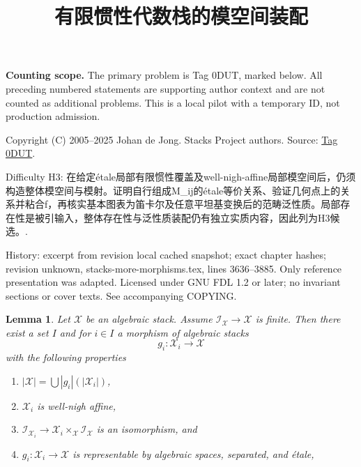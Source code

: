 \documentclass{amsart}
\theoremstyle{plain}
\newtheorem{lemma}[subsection]{Lemma}
\theoremstyle{definition}
\theoremstyle{remark}
\numberwithin{equation}{subsection}
\begin{document}
\title[Stacks Project, Tag 0DUT]{有限惯性代数栈的模空间装配}
\maketitle
\noindent\textbf{Counting scope.} The primary problem is Tag 0DUT, marked below. All preceding numbered statements are supporting author context and are not counted as additional problems. This is a local pilot with a temporary ID, not production admission.


\noindent Copyright (C) 2005--2025 Johan de Jong. Stacks Project authors. Source: \href{https://stacks.math.columbia.edu/tag/0DUT}{Tag 0DUT}.

\noindent Difficulty H3: 在给定étale局部有限惯性覆盖及well-nigh-affine局部模空间后，仍须构造整体模空间与模射。证明自行组成M\_ij的étale等价关系、验证几何点上的关系并粘合f，再核实基本图表为笛卡尔及任意平坦基变换后的范畴泛性质。局部存在性是被引输入，整体存在性与泛性质装配仍有独立实质内容，因此列为H3候选。.

\noindent History: excerpt from revision local cached snapshot; exact chapter hashes; revision unknown, stacks-more-morphisms.tex, lines 3636--3885. Only reference presentation was adapted. Licensed under GNU FDL 1.2 or later; no invariant sections or cover texts. See accompanying COPYING.

\begin{lemma}
\label{lemma-etale-local-finite-inertia}
Let $\mathcal{X}$ be an algebraic stack. Assume
$\mathcal{I}_\mathcal{X} \to \mathcal{X}$ is finite.
Then there exist a set $I$ and for $i \in I$ a morphism of algebraic stacks
$$
g_i : \mathcal{X}_i \longrightarrow \mathcal{X}
$$
with the following properties
\begin{enumerate}
\item $|\mathcal{X}| = \bigcup |g_i|(|\mathcal{X}_i|)$,
\item $\mathcal{X}_i$ is well-nigh affine,
\item $\mathcal{I}_{\mathcal{X}_i} \to
\mathcal{X}_i \times_\mathcal{X} \mathcal{I}_\mathcal{X}$
is an isomorphism, and
\item $g_i : \mathcal{X}_i \to \mathcal{X}$ is representable
by algebraic spaces, separated, and \'etale,
\end{enumerate}
\end{lemma}
\end{document}
